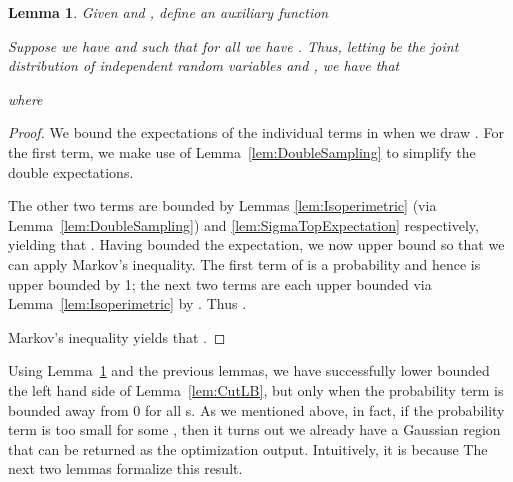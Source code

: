 \documentclass[11pt,letter]{article}
\newcounter{nTheorems}
\numberwithin{nTheorems}{section}
\newtheorem{lemma}[nTheorems]{Lemma}
\begin{document}
\begin{lemma}
\label{lem:MarkovGadget}
Given  and , define an auxiliary function

Suppose we have  and  such that for all  we have .
Thus, letting  be the joint distribution of independent random variables  and , we have that

where

\end{lemma}

\begin{proof}
We bound the expectations of the individual terms in  when we draw .
For the first term, we make use of Lemma~\ref{lem:DoubleSampling} to simplify the double expectations.

The other two terms are bounded by Lemmas \ref{lem:Isoperimetric} (via Lemma~\ref{lem:DoubleSampling}) and \ref{lem:SigmaTopExpectation} respectively, yielding that . Having bounded the expectation, we now upper bound  so that we can apply Markov's inequality. The first term of  is a probability and hence is upper bounded by 1; the next two terms are each upper bounded via Lemma~\ref{lem:Isoperimetric} by . Thus .

Markov's inequality yields that .
\end{proof}

Using Lemma~\ref{lem:MarkovGadget} and the previous lemmas, we have successfully lower bounded the left hand side of Lemma~\ref{lem:CutLB}, but only when the probability term is bounded away from 0 for all s.
As we mentioned above, in fact, if the probability term is too small for some , then it turns out we already have a Gaussian region that can be returned as the optimization output.
Intuitively, it is because
The next two lemmas formalize this result.
\end{document}

